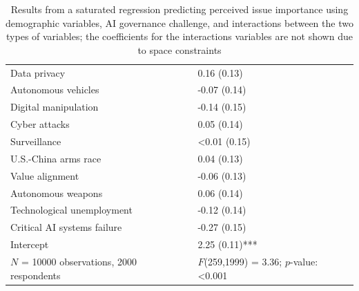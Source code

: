 \documentclass{article}
\begin{document}
\begin{table}[h]
\begin{tabular}{p{4.5cm}p{3cm}}
Data privacy & 0.16 (0.13)\\

Autonomous vehicles & -0.07 (0.14)\\

Digital manipulation & -0.14 (0.15)\\

Cyber attacks & 0.05 (0.14)\\

Surveillance & <0.01 (0.15)\\

U.S.-China arms race & 0.04 (0.13)\\

Value alignment & -0.06 (0.13)\\

Autonomous weapons & 0.06 (0.14)\\

Technological unemployment & -0.12 (0.14)\\

Critical AI systems failure & -0.27 (0.15)\\

Intercept & 2.25 (0.11)***\\
\hline
$N$ = 10000 observations, 2000 respondents & $F$(259,1999) = 3.36; $p$-value: <0.001\\
\hline
\end{tabular}
\caption{\label{tab:aigovregsat}Results from a saturated regression predicting perceived issue importance using demographic variables, AI governance challenge, and interactions between the two types of variables; the coefficients for the interactions variables are not shown due to space constraints}
\end{table}
\end{document}
